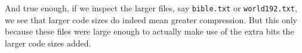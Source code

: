 \begin{refsection}
And true enough, if we inspect the larger files, say \verb|bible.txt|
or \verb|world192.txt|, we see that larger code sizes do indeed mean
greater compression. But this only because these files were large
enough to actually make use of the extra bits the larger code sizes
added.

\FloatBarrier

\printbibliography[heading=subbibliography]

\end{refsection}


